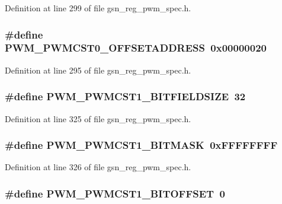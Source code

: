 Definition at line 299 of file gsn\_\-reg\_\-pwm\_\-spec.h.

\hypertarget{a00565_a5d19a1896da50e99e3f4ffbfa6e78b9a}{
\subsubsection[{PWM\_\-PWMCST0\_\-OFFSETADDRESS}]{\setlength{\rightskip}{0pt plus 5cm}\#define PWM\_\-PWMCST0\_\-OFFSETADDRESS~0x00000020}}
\label{a00565_a5d19a1896da50e99e3f4ffbfa6e78b9a}


Definition at line 295 of file gsn\_\-reg\_\-pwm\_\-spec.h.

\hypertarget{a00565_aece3415a67ea87bc39a36d41a98777ca}{
\subsubsection[{PWM\_\-PWMCST1\_\-BITFIELDSIZE}]{\setlength{\rightskip}{0pt plus 5cm}\#define PWM\_\-PWMCST1\_\-BITFIELDSIZE~32}}
\label{a00565_aece3415a67ea87bc39a36d41a98777ca}


Definition at line 325 of file gsn\_\-reg\_\-pwm\_\-spec.h.

\hypertarget{a00565_a520f5915f13969709b5dd5b809ae0189}{
\subsubsection[{PWM\_\-PWMCST1\_\-BITMASK}]{\setlength{\rightskip}{0pt plus 5cm}\#define PWM\_\-PWMCST1\_\-BITMASK~0xFFFFFFFF}}
\label{a00565_a520f5915f13969709b5dd5b809ae0189}


Definition at line 326 of file gsn\_\-reg\_\-pwm\_\-spec.h.

\hypertarget{a00565_adeb11942c3e819f9b566e0184e421124}{
\subsubsection[{PWM\_\-PWMCST1\_\-BITOFFSET}]{\setlength{\rightskip}{0pt plus 5cm}\#define PWM\_\-PWMCST1\_\-BITOFFSET~0}}
\label{a00565_adeb11942c3e819f9b566e0184e421124}


